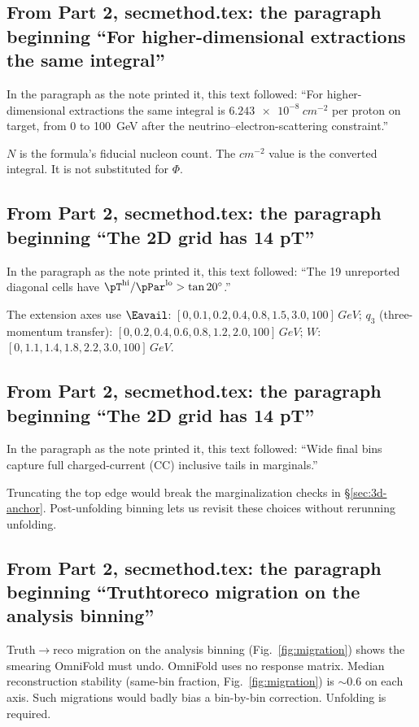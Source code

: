 \subsection{From Part 2, secmethod.tex: the paragraph beginning ``For higher-dimensional extractions the same integral''}
In the paragraph as the note printed it, this text followed: ``For higher-dimensional extractions the same integral is $\SI{6.243e-8}{cm^{-2}}$ per proton on target, from 0 to \SI{100}{GeV} after the neutrino--electron-scattering constraint.''\par
$N$ is the formula's fiducial nucleon count. The $\si{cm^{-2}}$ value is the converted integral. It is not substituted for $\Phi$.

\subsection{From Part 2, secmethod.tex: the paragraph beginning ``The 2D grid has 14 pT''}
In the paragraph as the note printed it, this text followed: ``The 19 unreported diagonal cells have $\pT^{\mathrm{hi}}/\pPar^{\mathrm{lo}}>\tan20^{\circ}$.''\par
The extension axes use $\Eavail$: $[0,0.1,0.2,0.4,0.8,1.5,3.0,100]\,\si{GeV}$; $q_{3}$ (three-momentum transfer): $[0,0.2,0.4,0.6,0.8,1.2,2.0,100]\,\si{GeV}$; $W$: $[0,1.1,1.4,1.8,2.2,3.0,100]\,\si{GeV}$.

\subsection{From Part 2, secmethod.tex: the paragraph beginning ``The 2D grid has 14 pT''}
In the paragraph as the note printed it, this text followed: ``Wide final bins capture full charged-current (CC) inclusive tails in marginals.''\par
Truncating the top edge would break the marginalization checks in \S\ref{sec:3d-anchor}. Post-unfolding binning lets us revisit these choices without rerunning unfolding.

\subsection{From Part 2, secmethod.tex: the paragraph beginning ``Truthtoreco migration on the analysis binning''}
Truth$\to$reco migration on the analysis binning (Fig.~\ref{fig:migration}) shows the smearing OmniFold must undo. OmniFold uses no response matrix. Median reconstruction stability (same-bin fraction, Fig.~\ref{fig:migration}) is $\sim0.6$ on each axis. Such migrations would badly bias a bin-by-bin correction. Unfolding is required.


